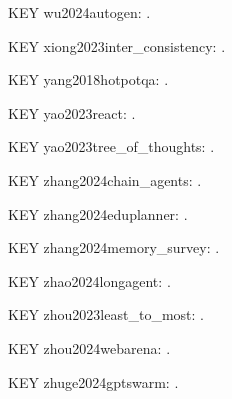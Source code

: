 \documentclass[a4paper,fleqn]{cas-dc}
\begin{document}
\noindent KEY wu2024autogen: \citep{wu2024autogen}.\par
\noindent KEY xiong2023inter\_consistency: \citep{xiong2023inter_consistency}.\par
\noindent KEY yang2018hotpotqa: \citep{yang2018hotpotqa}.\par
\noindent KEY yao2023react: \citep{yao2023react}.\par
\noindent KEY yao2023tree\_of\_thoughts: \citep{yao2023tree_of_thoughts}.\par
\noindent KEY zhang2024chain\_agents: \citep{zhang2024chain_agents}.\par
\noindent KEY zhang2024eduplanner: \citep{zhang2024eduplanner}.\par
\noindent KEY zhang2024memory\_survey: \citep{zhang2024memory_survey}.\par
\noindent KEY zhao2024longagent: \citep{zhao2024longagent}.\par
\noindent KEY zhou2023least\_to\_most: \citep{zhou2023least_to_most}.\par
\noindent KEY zhou2024webarena: \citep{zhou2024webarena}.\par
\noindent KEY zhuge2024gptswarm: \citep{zhuge2024gptswarm}.\par

\printbibliography
\end{document}
